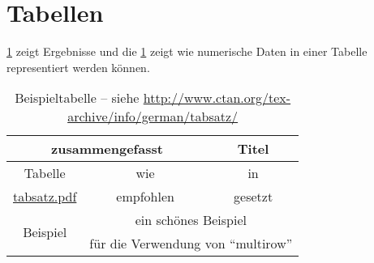 \iffalse %
Das SVG in \cref{fig:directSVG} ist direkt eingebunden, während der Text im SVG in \cref{fig:latexSVG} mittels pdflatex gesetzt ist.
Falls man die Graphiken sehen möchte, muss inkscape im PATH sein und im Tex-Quelltext \texttt{\textbackslash{}iffalse} und \texttt{\textbackslash{}iftrue} auskommentiert sein.

\begin{figure}
\centering
\texttt{[image: svgexample.svg]}
\caption{SVG direkt eingebunden}
\label{fig:directSVG}
\end{figure}

\begin{figure}
\centering
\def\svgwidth{.4\textwidth}

\caption{Text im SVG mittels \LaTeX{} gesetzt}
\label{fig:latexSVG}
\end{figure}
\fi %

\section{Tabellen}

\cref{tab:Ergebnisse} zeigt Ergebnisse und die \cref{tab:Ergebnisse} zeigt wie numerische Daten in einer Tabelle representiert werden können.
\begin{table}
  \centering
  \begin{tabular}{ccc}
  \toprule
  \multicolumn{2}{c}{\textbf{zusammengefasst}} & \textbf{Titel} \\ \midrule
  Tabelle & wie & in \\
  \url{tabsatz.pdf}& empfohlen & gesetzt\\

  \multirow{2}{*}{Beispiel} & \multicolumn{2}{c}{ein schönes Beispiel}\\
   & \multicolumn{2}{c}{für die Verwendung von \enquote{multirow}}\\
  \bottomrule
  \end{tabular}
  \caption[Beispieltabelle]{Beispieltabelle -- siehe \url{http://www.ctan.org/tex-archive/info/german/tabsatz/}}
  \label{tab:Ergebnisse}
\end{table}

